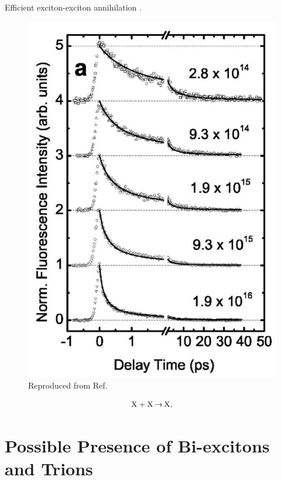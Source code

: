 Efficient exciton-exciton annihilation \cite{murakami2009existence}.

\begin{figure}[h]
	\centering
	\includegraphics[scale=0.4]{images/chapter_prior_works/pl_valkunas}
	\caption{Reproduced from Ref.\ \cite{valkunas2006exciton}}
\end{figure}

\begin{equation}
\label{eq:exc_annih}
\ce{X + X $\rightarrow$ X},
\end{equation}


\section{Possible Presence of Bi-excitons and Trions}

